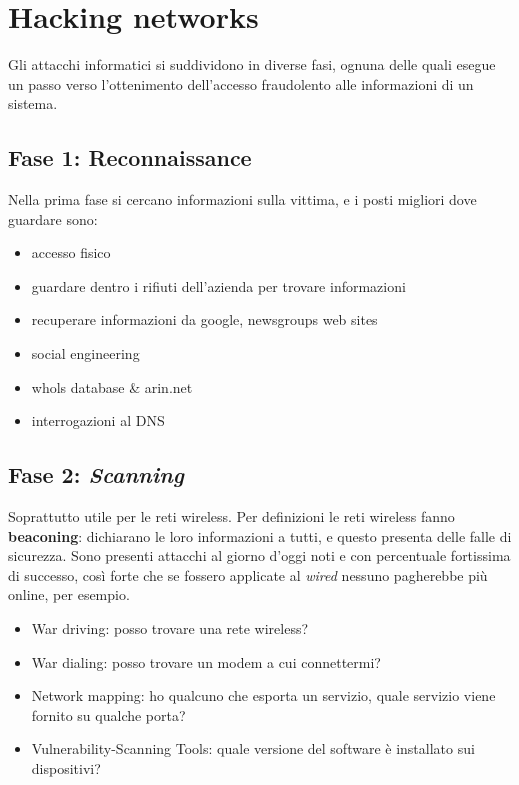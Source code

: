
\section{Hacking networks}

Gli attacchi informatici si suddividono in diverse fasi, ognuna delle quali 
esegue un passo verso l'ottenimento dell'accesso fraudolento alle informazioni 
di un sistema.


\subsection{Fase 1: Reconnaissance}

Nella prima fase si cercano informazioni sulla vittima, e i posti migliori dove 
guardare sono:
\begin{itemize}
 \item accesso fisico
 \item guardare dentro i rifiuti dell'azienda per trovare informazioni
 \item recuperare informazioni da google, newsgroups web sites
 \item social engineering
 \item whols database \& arin.net
 \item interrogazioni al DNS
\end{itemize}

\subsection{Fase 2: \textit{Scanning}}

Soprattutto utile per le reti wireless. Per definizioni le reti wireless fanno 
\textbf{beaconing}: dichiarano le loro informazioni a tutti, e questo presenta 
delle falle di sicurezza. Sono presenti attacchi al giorno d'oggi noti e con 
percentuale fortissima di successo, così forte che se fossero applicate al 
\textit{wired} nessuno pagherebbe più online, per esempio.

\begin{itemize}
\item War driving: posso trovare una rete wireless?
\item War dialing: posso trovare un modem a cui connettermi?
\item Network mapping: ho qualcuno che esporta un servizio, quale servizio 
viene fornito su qualche porta?
\item Vulnerability-Scanning Tools: quale versione del software è installato 
sui dispositivi?
\end{itemize}

